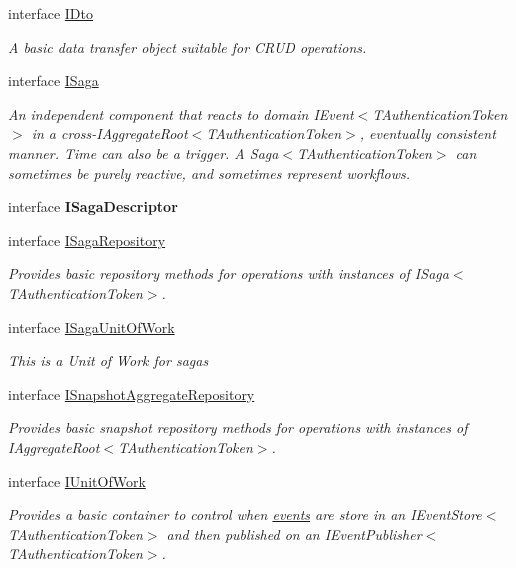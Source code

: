 \begin{DoxyCompactItemize}
interface \hyperlink{interfaceCqrs_1_1Domain_1_1IDto}{I\+Dto}
\begin{DoxyCompactList}\small\item\em A basic data transfer object suitable for C\+R\+UD operations. \end{DoxyCompactList}\item 
interface \hyperlink{interfaceCqrs_1_1Domain_1_1ISaga}{I\+Saga}
\begin{DoxyCompactList}\small\item\em An independent component that reacts to domain I\+Event$<$\+T\+Authentication\+Token$>$ in a cross-\/I\+Aggregate\+Root$<$\+T\+Authentication\+Token$>$, eventually consistent manner. Time can also be a trigger. A Saga$<$\+T\+Authentication\+Token$>$ can sometimes be purely reactive, and sometimes represent workflows. \end{DoxyCompactList}\item 
interface {\bfseries I\+Saga\+Descriptor}
\item 
interface \hyperlink{interfaceCqrs_1_1Domain_1_1ISagaRepository}{I\+Saga\+Repository}
\begin{DoxyCompactList}\small\item\em Provides basic repository methods for operations with instances of I\+Saga$<$\+T\+Authentication\+Token$>$. \end{DoxyCompactList}\item 
interface \hyperlink{interfaceCqrs_1_1Domain_1_1ISagaUnitOfWork}{I\+Saga\+Unit\+Of\+Work}
\begin{DoxyCompactList}\small\item\em This is a Unit of Work for sagas \end{DoxyCompactList}\item 
interface \hyperlink{interfaceCqrs_1_1Domain_1_1ISnapshotAggregateRepository}{I\+Snapshot\+Aggregate\+Repository}
\begin{DoxyCompactList}\small\item\em Provides basic snapshot repository methods for operations with instances of I\+Aggregate\+Root$<$\+T\+Authentication\+Token$>$. \end{DoxyCompactList}\item 
interface \hyperlink{interfaceCqrs_1_1Domain_1_1IUnitOfWork}{I\+Unit\+Of\+Work}
\begin{DoxyCompactList}\small\item\em Provides a basic container to control when \hyperlink{}{events} are store in an I\+Event\+Store$<$\+T\+Authentication\+Token$>$ and then published on an I\+Event\+Publisher$<$\+T\+Authentication\+Token$>$. \end{DoxyCompactList}\item 

\end{DoxyCompactItemize}
